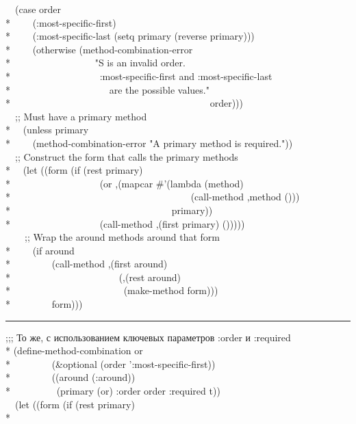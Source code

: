 \begin{defmac}
\begin{lisp}
~~(case order \\*
~~~~(:most-specific-first) \\*
~~~~(:most-specific-last (setq primary (reverse primary))) \\*
~~~~(otherwise (method-combination-error \\*
~~~~~~~~~~~~~~~~~"{\Xtilde}S is an invalid order.{\Xtilde}{\Xatsign} \\*
~~~~~~~~~~~~~~~~~~:most-specific-first and :most-specific-last {\Xtilde} \\*
~~~~~~~~~~~~~~~~~~~~are the possible values." \\*
~~~~~~~~~~~~~~~~~~~~~~~~~~~~~~~~~~~~~~~~~order))) \\
~~;; Must have a primary method \\*
~~(unless primary \\*
~~~~(method-combination-error "A primary method is required.")) \\
~~;; Construct the form that calls the primary methods \\*
~~(let ((form (if (rest primary) \\*
~~~~~~~~~~~~~~~~~~{\Xbq}(or ,{\Xatsign}(mapcar \#'(lambda (method) \\*
~~~~~~~~~~~~~~~~~~~~~~~~~~~~~~~~~~~~~{\Xbq}(call-method ,method ())) \\*
~~~~~~~~~~~~~~~~~~~~~~~~~~~~~~~~~primary)) \\*
~~~~~~~~~~~~~~~~~~{\Xbq}(call-method ,(first primary) ())))) \\
~~~~;; Wrap the around methods around that form \\*
~~~~(if around \\*
~~~~~~~~{\Xbq}(call-method ,(first around) \\*
~~~~~~~~~~~~~~~~~~~~~~(,{\Xatsign}(rest around) \\*
~~~~~~~~~~~~~~~~~~~~~~~(make-method form))) \\*
~~~~~~~~form)))
\end{lisp}
\hrule width 0pt\relax
\begin{lisp}
;;; То же, с использованием ключевых параметров :order и :required \\*
(define-method-combination or  \\*
~~~~~~~~(\&optional (order ':most-specific-first)) \\*
~~~~~~~~((around (:around)) \\*
~~~~~~~~~(primary (or) :order order :required t)) \\
~~(let ((form (if (rest primary) \\*

\end{lisp}
\end{defmac}
